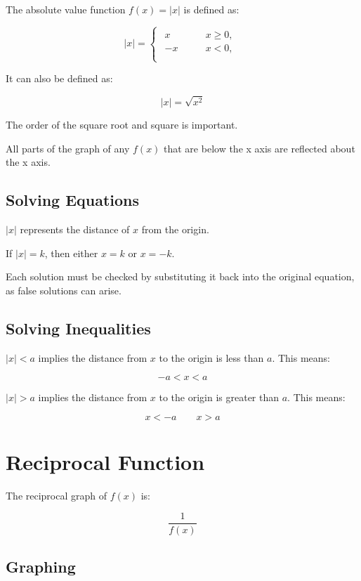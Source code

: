 \documentclass[a4paper,11pt]{article}
\begin{document}
The absolute value function $f(x) = \lvert x \rvert$ is defined as:

$$
\lvert x \rvert = \begin{cases}
\begin{aligned}
	x \qquad & x \geq 0, \\
	-x \qquad & x < 0, \\
\end{aligned}
\end{cases}
$$

It can also be defined as:

$$
\lvert x \rvert = \sqrt{x^2}
$$

The order of the square root and square is important.

All parts of the graph of any $f(x)$ that are below the x axis are reflected
about the x axis.


\subsection{Solving Equations}

$\lvert x \rvert$ represents the distance of $x$ from the origin.

If $\lvert x \rvert = k$, then either $x = k$ or $x = -k$.

Each solution must be checked by substituting it back into the original
equation, as false solutions can arise.


\subsection{Solving Inequalities}

$\lvert x \rvert < a$ implies the distance from $x$ to the origin is less than
$a$. This means:

$$
-a < x < a
$$

$\lvert x \rvert > a$ implies the distance from $x$ to the origin is greater
than $a$. This means:

$$
x < -a \qquad x > a
$$




\section{Reciprocal Function}

The reciprocal graph of $f(x)$ is:

$$
\frac{1}{f(x)}
$$


\subsection{Graphing}
\end{document}
